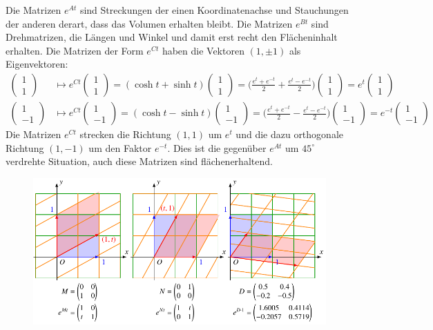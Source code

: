 \begin{beispiel}
Die Matrizen $e^{At}$ sind Streckungen der einen Koordinatenachse und
Stauchungen der anderen derart, dass das Volumen erhalten bleibt.
Die Matrizen $e^{Bt}$ sind Drehmatrizen, die Längen und Winkel und
damit erst recht den Flächeninhalt erhalten.
Die Matrizen der Form $e^{Ct}$ haben die Vektoren $(1,\pm1)$ als
Eigenvektoren:
\begin{align*}
\begin{pmatrix}1\\1\end{pmatrix}
&\mapsto
e^{Ct}
\begin{pmatrix}1\\1\end{pmatrix}
=
(\cosh t +\sinh t)
\begin{pmatrix}1\\1\end{pmatrix}
=
\biggl(
\frac{e^t+e^{-t}}2
+
\frac{e^t-e^{-t}}2
\biggr)
\begin{pmatrix}1\\1\end{pmatrix}
=
e^t
\begin{pmatrix}1\\1\end{pmatrix}
\\
\begin{pmatrix}1\\-1\end{pmatrix}
&\mapsto
e^{Ct}
\begin{pmatrix}1\\-1\end{pmatrix}
=
(\cosh t -\sinh t)
\begin{pmatrix}1\\-1\end{pmatrix}
=
\biggl(
\frac{e^t+e^{-t}}2
-
\frac{e^t-e^{-t}}2
\biggr)
\begin{pmatrix}1\\-1\end{pmatrix}
=
e^{-t}
\begin{pmatrix}1\\-1\end{pmatrix}
\end{align*}
Die Matrizen $e^{Ct}$ strecken die Richtung $(1,1)$ um $e^t$ und
die dazu orthogonale Richtung $(1,-1)$ um den Faktor $e^{-t}$.
Dies ist die gegenüber $e^{At}$ um $45^\circ$ verdrehte Situation,
auch diese Matrizen sind flächenerhaltend.
\begin{figure}
\centering
\includegraphics{chapters/60-gruppen/images/scherungen.pdf}

\end{figure}
\end{beispiel}
